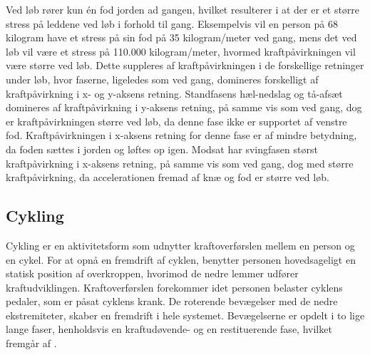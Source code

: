 Ved løb rører kun én fod jorden ad gangen, hvilket resulterer i at der er et større stress på leddene ved løb i forhold til gang. Eksempelvis vil en person på 68 kilogram have et stress på sin fod på 35 kilogram/meter ved gang, mens det ved løb vil være et stress på 110.000 kilogram/meter, hvormed kraftpåvirkningen vil være større ved løb.\citep{Adelaar1986}
Dette suppleres af kraftpåvirkningen i de forskellige retninger under løb, hvor faserne, ligeledes som ved gang, domineres forskelligt af kraftpåvirkning i x- og y-aksens retning. \newline 
Standfasens hæl-nedslag og tå-afsæt domineres af kraftpåvirkning i y-aksens retning, på samme vis som ved gang, dog er kraftpåvirkningen større ved løb, da denne fase ikke er supportet af venstre fod. Kraftpåvirkningen i x-aksens retning for denne fase er af mindre betydning, da foden sættes i jorden og løftes op igen. 
Modsat har svingfasen størst kraftpåvirkning i x-aksens retning, på samme vis som ved gang, dog med større kraftpåvirkning, da accelerationen fremad af knæ og fod er større ved løb.\citep{Rueterbories2010} 


\subsection{Cykling}
Cykling er en aktivitetsform som udnytter kraftoverførslen mellem en person og en cykel. For at opnå en fremdrift af cyklen, benytter personen hovedsageligt en statisk position af overkroppen, hvorimod de nedre lemmer udfører kraftudviklingen. \citep{Springer2014} \newline 
Kraftoverførslen forekommer idet personen belaster cyklens pedaler, som er påsat cyklens krank. De roterende bevægelser med de nedre ekstremiteter, skaber en fremdrift i hele systemet. Bevægelserne er opdelt i to lige lange faser, henholdsvis en kraftudøvende- og en restituerende fase, hvilket fremgår af .

